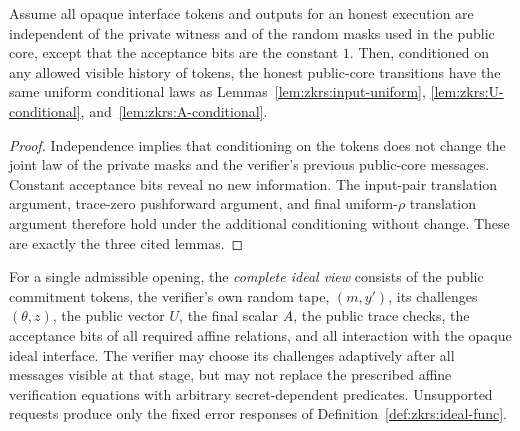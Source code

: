 \begin{lemma}\label{lem:zkrs:opaque-kernels}
Assume all opaque interface tokens and outputs for an
honest execution are independent of the private witness and
of the random masks used in the public core, except that the
acceptance bits are the constant $1$.
Then, conditioned on any allowed visible history of tokens,
the honest public-core transitions have the same uniform
conditional laws as Lemmas~\ref{lem:zkrs:input-uniform},
\ref{lem:zkrs:U-conditional}, and~\ref{lem:zkrs:A-conditional}.
\end{lemma}
\begin{proof}
Independence implies that conditioning on the tokens
does not change the joint law of the private masks
and the verifier's previous public-core messages.
Constant acceptance bits reveal no new information.
The input-pair translation argument, trace-zero
pushforward argument, and final uniform-$\rho$
translation argument therefore hold under the
additional conditioning without change.
These are exactly the three cited lemmas.
\end{proof}

\begin{definition}\label{def:zkrs:ideal-view}
For a single admissible opening, the \emph{complete ideal view}
consists of the public commitment tokens, the verifier's own
random tape, $(m,y')$, its challenges $(\theta,z)$,
the public vector $U$, the final scalar $A$,
the public trace checks, the acceptance bits of all
required affine relations, and all interaction with
the opaque ideal interface.
The verifier may choose its challenges adaptively
after all messages visible at that stage, but may not
replace the prescribed affine verification equations with
arbitrary secret-dependent predicates. Unsupported requests
produce only the fixed error responses of
Definition~\ref{def:zkrs:ideal-func}.
\end{definition}


